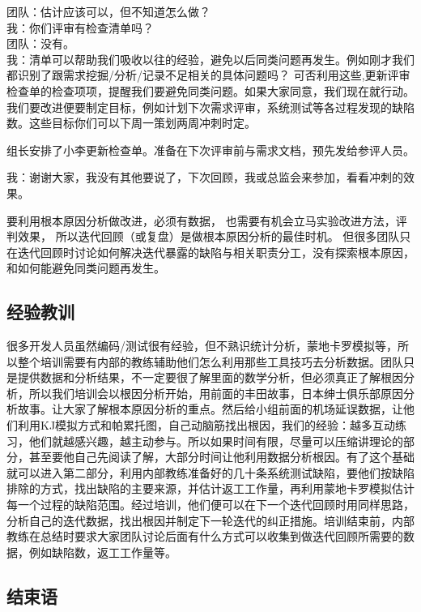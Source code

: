 团队：估计应该可以，但不知道怎么做？\\
我：你们评审有检查清单吗？\\
团队：没有。\\
我：清单可以帮助我们吸收以往的经验，避免以后同类问题再发生。例如刚才我们都识别了跟需求挖掘/分析/记录不足相关的具体问题吗？
可否利用这些,更新评审检查单的检查项项，提醒我们要避免同类问题。如果大家同意，我们现在就行动。我们要改进便要制定目标，例如计划下次需求评审，系统测试等各过程发现的缺陷数。这些目标你们可以下周一策划两周冲刺时定。

组长安排了小李更新检查单。准备在下次评审前与需求文档，预先发给参评人员。

我：谢谢大家，我没有其他要说了，下次回顾，我或总监会来参加，看看冲刺的效果。

要利用根本原因分析做改进，必须有数据，
也需要有机会立马实验改进方法，评判效果，
所以迭代回顾（或复盘）是做根本原因分析的最佳时机。
但很多团队只在迭代回顾时讨论如何解决迭代暴露的缺陷与相关职责分工，没有探索根本原因，
和如何能避免同类问题再发生。

\hypertarget{ux7ecfux9a8cux6559ux8bad}{%
\subsection{经验教训}\label{ux7ecfux9a8cux6559ux8bad}}

很多开发人员虽然编码/测试很有经验，但不熟识统计分析，蒙地卡罗模拟等，所以整个培训需要有内部的教练辅助他们怎么利用那些工具技巧去分析数据。团队只是提供数据和分析结果，不一定要很了解里面的数学分析，但必须真正了解根因分析，所以我们培训会以根因分析开始，用前面的丰田故事，日本绅士俱乐部原因分析故事。让大家了解根本原因分析的重点。然后给小组前面的机场延误数据，让他们利用KJ模拟方式和帕累托图，自己动脑筋找出根因，我们的经验：越多互动练习，他们就越感兴趣，越主动参与。所以如果时间有限，尽量可以压缩讲理论的部分，甚至要他自己先阅读了解，大部分时间让他利用数据分析根因。有了这个基础就可以进入第二部分，利用内部教练准备好的几十条系统测试缺陷，要他们按缺陷排除的方式，找出缺陷的主要来源，并估计返工工作量，再利用蒙地卡罗模拟估计每一个过程的缺陷范围。经过培训，他们便可以在下一个迭代回顾时用同样思路，分析自己的迭代数据，找出根因并制定下一轮迭代的纠正措施。培训结束前，内部教练在总结时要求大家团队讨论后面有什么方式可以收集到做迭代回顾所需要的数据，例如缺陷数，返工工作量等。

\hypertarget{ux7ed3ux675fux8bed}{%
\subsection{结束语}\label{ux7ed3ux675fux8bed}}

